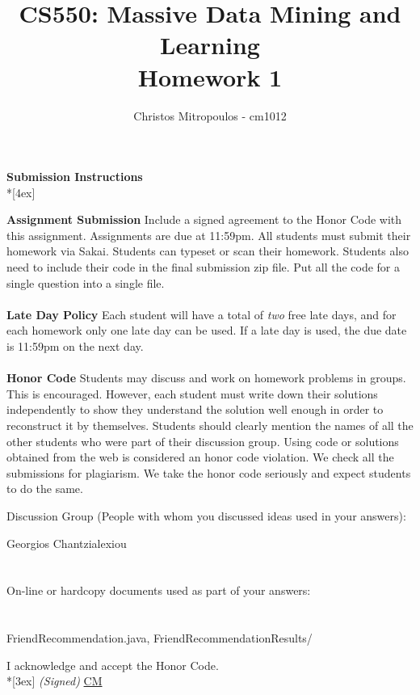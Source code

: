 \documentclass[11pt]{article}
\title{\LARGE{\bf \textsf{CS550: Massive Data Mining and Learning}}\\ {\bf \textsf{Homework 1}}}
\author{Christos Mitropoulos - cm1012}
\date{}
\begin{document}
\begin{titlepage}
\maketitle
\end{titlepage}

\pagebreak[4]
\begin{center}
\LARGE{\bf \textsf{Submission Instructions}} \\*[4ex]
\end{center}

\textbf{Assignment Submission } Include a signed agreement to the Honor Code with this assignment. Assignments are due at 11:59pm. All students must submit their homework via Sakai. Students can typeset or scan their homework. Students also need to include their code in the final submission zip file. Put all the code for a single question into a single file. 
\\
\\
\textbf{Late Day Policy } Each student will have a total of {\em two} free late days, and for each homework only one late day can be used. If a late day is used, the due date is 11:59pm on the next day.
\\
\\
\textbf{Honor Code } Students may discuss and work on homework problems in groups. This is encouraged. However, each student must write down their solutions independently to show they understand the solution well enough in order to reconstruct it by themselves.  Students should clearly mention the names of all the other students who were part of their discussion group. Using code or solutions obtained from the web is considered an honor code violation. We check all the submissions for plagiarism. We take the honor code seriously and expect students to do the same. 

\vfill
\vfill

Discussion Group (People with whom you discussed ideas used in your answers):

 Georgios Chantzialexiou \\\\\\
On-line or hardcopy documents used as part of your answers: \\\\\\
\vfill
FriendRecommendation.java, FriendRecommendationResults/
\vfill

I acknowledge and accept the Honor Code.\\*[3ex]
\bigskip
\textit{(Signed)} \underline{CM} 
\end{document}
